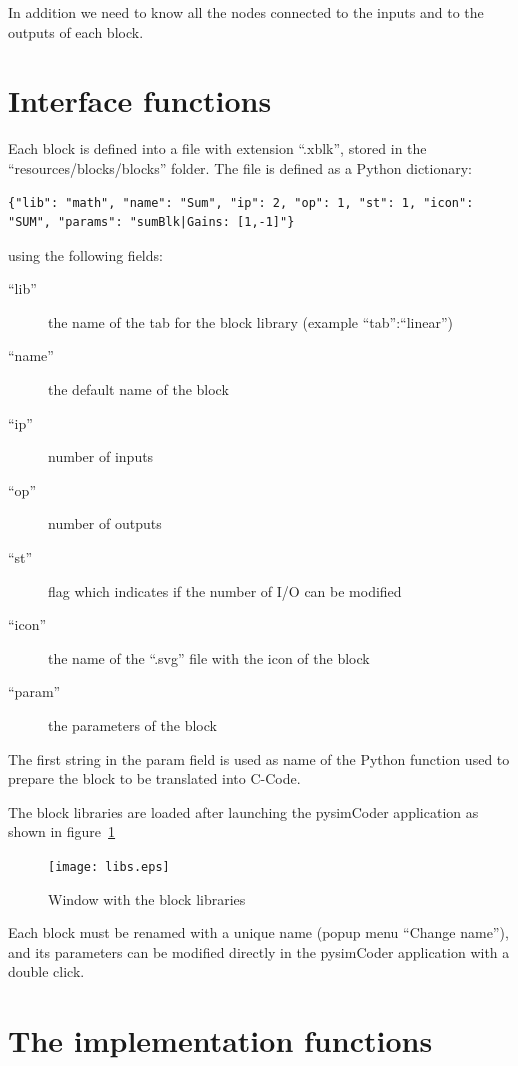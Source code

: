 In addition we need to know all the nodes connected to the inputs and to the 
outputs of each block.

\section{Interface functions}

Each block is defined into a file with extension ``.xblk'', stored in 
the ``resources/blocks/blocks'' folder.
The file is defined as a Python dictionary:

\scriptsize
\begin{verbatim}
{"lib": "math", "name": "Sum", "ip": 2, "op": 1, "st": 1, "icon": "SUM", "params": "sumBlk|Gains: [1,-1]"}
\end{verbatim}
\normalsize

using the following fields:

\begin{description}
\item[``lib''] the name of the tab for the block library (example 
``tab'':``linear'')
\item [``name''] the default name of the block
\item [``ip''] number of inputs
\item [``op''] number of outputs
\item [``st''] flag which indicates if the number of I/O can be modified
\item [``icon'']the name of the ``.svg'' file with the icon of the block
\item [``param''] the parameters of the block
\end{description}

The first string in the param field is used as name of the Python function used 
to prepare the block to be translated into C-Code.

The block libraries are loaded after launching the pysimCoder application as shown 
in figure~\ref{Fig:app1}

 \begin{figure}[htbp]	%
 \centering
 \texttt{[image: libs.eps]}
 \caption{Window with the block libraries}
 \label{Fig:app1}
 \end{figure}

Each block must be renamed with a unique name (popup menu ``Change name''), and 
its parameters can be modified directly in the pysimCoder application with a double 
click.

\section{The implementation functions}

